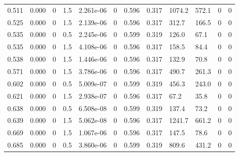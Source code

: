 \documentclass[preview]{standalone}
\begin{document}
{{\begin{tabular}{L{1.2cm}C{1.2cm} C{0.3cm}C{0.5cm} C{1.4cm}C{1.4cm} C{1.4cm}C{1.4cm} C{1.6cm}C{1.6cm} C{1.6cm}C{1.6cm}}
  0.511  &  0.000  & 0     & 1.5 &  2.261e-06  & 0  &  0.596&   0.317& 1074.2 & 572.1   &  0 & 0  \\ 
  0.525  &  0.000  & 0     & 1.5 &  2.139e-06  & 0  &  0.596&   0.317& 312.7 & 166.5   &  0 & 0  \\ 
  0.535  &  0.000  & 0     & 0.5 &  2.245e-06  & 0  &  0.599&   0.319& 126.0 & 67.1   &  0 & 0  \\ 
  0.535  &  0.000  & 0     & 1.5 &  4.108e-06  & 0  &  0.596&   0.317& 158.5 & 84.4   &  0 & 0  \\ 
  0.538  &  0.000  & 0     & 1.5 &  1.446e-06  & 0  &  0.596&   0.317& 132.9 & 70.8   &  0 & 0  \\ 
  0.571  &  0.000  & 0     & 1.5 &  3.786e-06  & 0  &  0.596&   0.317& 490.7 & 261.3   &  0 & 0  \\ 
  0.602  &  0.000  & 0     & 0.5 &  5.009e-07  & 0  &  0.599&   0.319& 456.3 & 243.0   &  0 & 0  \\ 
  0.621  &  0.000  & 0     & 1.5 &  2.938e-07  & 0  &  0.596&   0.317& 67.2 & 35.8   &  0 & 0  \\ 
  0.638  &  0.000  & 0     & 0.5 &  6.508e-08  & 0  &  0.599&   0.319& 137.4 & 73.2   &  0 & 0  \\ 
  0.639  &  0.000  & 0     & 1.5 &  5.062e-08  & 0  &  0.596&   0.317& 1241.7 & 661.2   &  0 & 0  \\ 
  0.669  &  0.000  & 0     & 1.5 &  1.067e-06  & 0  &  0.596&   0.317& 147.5 & 78.6   &  0 & 0  \\ 
  0.685  &  0.000  & 0     & 0.5 &  3.860e-06  & 0  &  0.599&   0.319& 809.6 & 431.2   &  0 & 0  \\ 
\hline 
\end{tabular} 

}}
\end{document}
